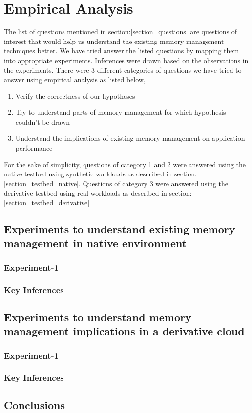 
\chapter{Empirical Analysis}

  The list of questions mentioned in section:\ref{section_questions} are questions of interest that would help us understand the existing 
memory management techniques better. We have tried answer the listed questions by mapping them into appropriate experiments. Inferences 
were drawn based on the observations in the experiments. There were 3 different categories of questions we have tried to answer using 
empirical analysis as listed below,
  
  \begin{enumerate}
    \item Verify the correctness of our hypotheses
    \item Try to understand parts of memory management for which hypothesis couldn't be drawn
    \item Understand the implications of existing memory management on application performance
  \end{enumerate}
  
  For the sake of simplicity, questions of category 1 and 2 were answered using the native testbed using synthetic workloads as described 
in section:\ref{section_testbed_native}. Questions of category 3 were answered using the derivative testbed using real workloads as 
described in section:\ref{section_testbed_derivative}

  \section{Experiments to understand existing memory management in native environment}
    
    \subsection{Experiment-1}
    
    \subsection{Key Inferences}
    
  \section{Experiments to understand memory management implications in a derivative cloud}
  
    \subsection{Experiment-1}
    
    \subsection{Key Inferences}
    
  \section{Conclusions}
  
